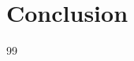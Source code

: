 \documentclass[10pt,twocolumn]{article}
\begin{document}
\section{Conclusion}
\label{sec:conclusion}
\begin{thebibliography}{99}

% 
\end{thebibliography}
\end{document}
